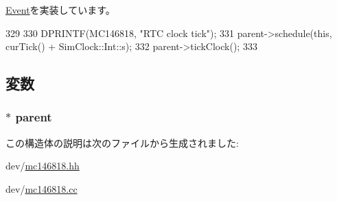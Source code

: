 \hyperlink{classEvent_a142b75b68a6291400e20fb0dd905b1c8}{Event}を実装しています。


\begin{DoxyCode}
329 {
330     DPRINTF(MC146818, "RTC clock tick\n");
331     parent->schedule(this, curTick() + SimClock::Int::s);
332     parent->tickClock();
333 }
\end{DoxyCode}


\subsection{変数}
\hypertarget{structMC146818_1_1RTCTickEvent_a2013f7dfc8d6920600d61ad1f696a537}{
\subsubsection[{parent}]{$\ast$ {\bf parent}}}
\label{structMC146818_1_1RTCTickEvent_a2013f7dfc8d6920600d61ad1f696a537}


この構造体の説明は次のファイルから生成されました:\begin{DoxyCompactItemize}
\item 
dev/\hyperlink{mc146818_8hh}{mc146818.hh}\item 
dev/\hyperlink{mc146818_8cc}{mc146818.cc}\end{DoxyCompactItemize}
